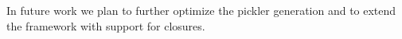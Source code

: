 \documentclass[preprint,10pt]{sigplanconf}
\theoremstyle{definition}
\theoremstyle{definition}
\begin{document}
In future work we plan to further optimize the pickler generation and
to extend the framework with support for closures.













\begin{spacing}{0.9}


\end{spacing}
\end{document}
